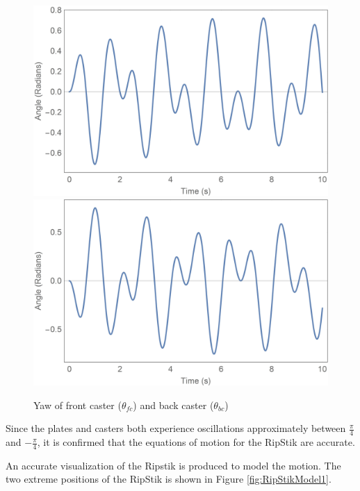 \begin{figure}[!htb]
	\centering
	\includegraphics[width=\linewidth]{thetafc}
	\endminipage\hspace{1em}%
	\includegraphics[width=\linewidth]{thetabc}
	\endminipage
	\caption{Yaw of front caster ($\theta_{fc}$) and back caster ($\theta_{bc}$)}
	\label{fig:casters}
\end{figure}

Since the plates and casters both experience oscillations approximately between  $\frac{\pi}{4}$ and $-\frac{\pi}{4}$, it is confirmed that the equations of motion for the RipStik are accurate.

An accurate visualization of the Ripstik is produced to model the motion. 
The two extreme positions of the RipStik is shown in Figure \ref{fig:RipStikModel1}.


